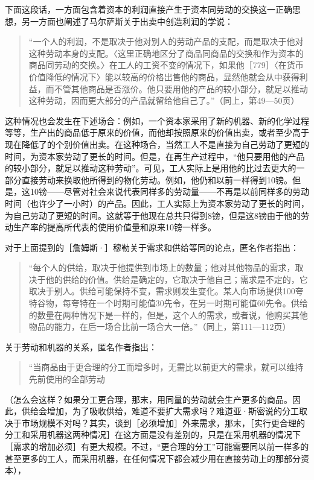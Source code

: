 下面这段话，一方面包含着资本的利润直接产生于资本同劳动的交换这一正确思想，另一方面也阐述了马尔萨斯关于出卖中创造利润的学说：

\begin{quote}{“一个人的利润，不是取决于他对别人的劳动产品的支配，而是取决于他对这种劳动本身的支配。〈这里正确地区分了商品同商品的交换和作为资本的商品同劳动的交换。〉在工人的工资不变的情况下，如果他［779］〈在货币价值降低的情况下〉能以较高的价格出售他的商品，显然他就会从中获得利益，而不管其他商品是否涨价。他只要用他的产品的较小部分，就足以推动这种劳动，因而更大部分的产品就留给他自己了。”（同上，第49—50页）}\end{quote}

这种情况也会发生在下述场合：例如，一个资本家采用了新的机器、新的化学过程等等，生产出的商品低于原来的价值，而他却按照原来的价值出卖，或者至少高于现在降低了的个别价值出卖。在这种场合，当然工人不是直接为自己劳动了更短的时间，为资本家劳动了更长的时间。但是，在再生产过程中，“他只要用他的产品的较小部分，就足以推动这种劳动”。可见，工人实际上是用他的比过去更大的一部分直接劳动来换取他所得到的物化劳动。例如，他仍和以前一样得到10镑。但是，这10镑——尽管对社会来说代表同样多的劳动量——不再是以前同样多的劳动时间（也许少了一小时）的产品。因此，工人实际上为资本家劳动了更长的时间，为自己劳动了更短的时间。这就等于他现在总共只得到8镑，但是这8镑由于他的劳动生产率的提高所代表的使用价值量和原来10镑一样多。

对于上面提到的［詹姆斯·］穆勒关于需求和供给等同的论点，匿名作者指出：

\begin{quote}{“每个人的供给，取决于他提供到市场上的数量；他对其他物品的需求，取决于他的供给的价值。供给是确定的，它取决于他自己；需求是不定的，它取决于别人。供给可能保持不变，需求则发生变化。某人向市场提供100夸特谷物，每夸特在一个时期可能值30先令，在另一时期可能值60先令。供给的数量在两种情况下是一样的，但是，这个人的需求，或者说，他购买其他物品的能力，在后一场合比前一场合大一倍。”（同上，第111—112页）}\end{quote}

关于劳动和机器的关系，匿名作者指出：

\begin{quote}{“当商品由于更合理的分工而增多时，无需比以前更大的需求，就可以维持先前使用的全部劳动}\end{quote}

（怎么会这样？如果分工更合理，那末，用同量的劳动就会生产更多的商品。因此，供给会增加，为了吸收供给，难道不要扩大需求吗？难道亚·斯密说的分工取决于市场规模不对吗？其实，谈到［必须增加］外来需求，那末，［实行更合理的分工和采用机器这两种情况］在这方面是没有差别的，只是在采用机器的情况下［需求的增加必须］有更大规模。不过，“更合理的分工”可能需要同以前一样多的甚至更多的工人，而采用机器，在任何情况下都会减少用在直接劳动上的那部分资本），

